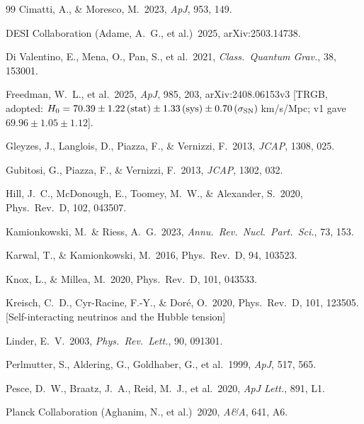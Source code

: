 \documentclass[12pt,a4paper]{article}
\newcommand{\prd}{Phys.\ Rev.\ D}
\begin{document}
\begin{thebibliography}{99}
Cimatti, A., \& Moresco, M.\ 2023, \textit{ApJ}, 953, 149.

DESI Collaboration (Adame, A.~G., et al.)\ 2025, arXiv:2503.14738.

Di Valentino, E., Mena, O., Pan, S., et al.\ 2021,
\textit{Class.\ Quantum Grav.}, 38, 153001.

Freedman, W.~L., et al.\ 2025, \textit{ApJ}, 985, 203, arXiv:2408.06153v3
[TRGB, adopted: $H_0 = 70.39\pm1.22\,(\mathrm{stat})\pm1.33\,(\mathrm{sys})\pm0.70\,(\sigma_{\rm SN})$\,km/s/Mpc; v1 gave $69.96\pm1.05\pm1.12$].

Gleyzes, J., Langlois, D., Piazza, F., \& Vernizzi, F.\ 2013,
\textit{JCAP}, 1308, 025.

Gubitosi, G., Piazza, F., \& Vernizzi, F.\ 2013, \textit{JCAP}, 1302, 032.

Hill, J.~C., McDonough, E., Toomey, M.~W., \& Alexander, S.\ 2020,
\prd, 102, 043507.

Kamionkowski, M.\ \& Riess, A.~G.\ 2023,
\textit{Annu.\ Rev.\ Nucl.\ Part.\ Sci.}, 73, 153.

Karwal, T., \& Kamionkowski, M.\ 2016, \prd, 94, 103523.

Knox, L., \& Millea, M.\ 2020, \prd, 101, 043533.

Kreisch, C.~D., Cyr-Racine, F.-Y., \& Dor\'e, O.\ 2020,
\prd, 101, 123505. [Self-interacting neutrinos and the Hubble tension]

Linder, E.~V.\ 2003, \textit{Phys.\ Rev.\ Lett.}, 90, 091301.

Perlmutter, S., Aldering, G., Goldhaber, G., et al.\ 1999, \textit{ApJ}, 517, 565.

Pesce, D.~W., Braatz, J.~A., Reid, M.~J., et al.\ 2020,
\textit{ApJ Lett.}, 891, L1.

Planck Collaboration (Aghanim, N., et al.)\ 2020, \textit{A\&A}, 641, A6.


\end{thebibliography}
\end{document}

